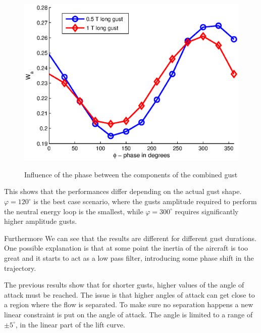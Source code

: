 \begin{figure}[ht]
  \begin{center}
    \scalebox{1.0}
    {\includegraphics{./Figures/combined_gust_amplitude_vs_phase_LUT.eps}}
  \end{center}
  \caption{Influence of the phase between the components of the combined gust}
  \label{fig:combined_amplitude_phase}
\end{figure}

\par This shows that the performances differ depending on the actual gust shape.
$\varphi=120^{\circ}$ is the best case scenario, where the gusts amplitude required to perform the neutral energy loop is the smallest, while $\varphi=300^{\circ}$ requires significantly higher amplitude gusts.

\FloatBarrier

\par Furthermore We can see that the results are different for different gust durations.
One possible explanation is that at some point the inertia of the aircraft is too great and it starts to act as a low pass filter, introducing some phase shift in the trajectory. 

The previous results show that for shorter gusts, higher values of the angle of attack must be reached.
The issue is that higher angles of attack can get close to a region where the flow is separated.
To make sure no separation happens a new linear constraint is put on the angle of attack.
The angle is limited to a range of $\pm 5 ^{\circ}$, in the linear part of the lift curve.


